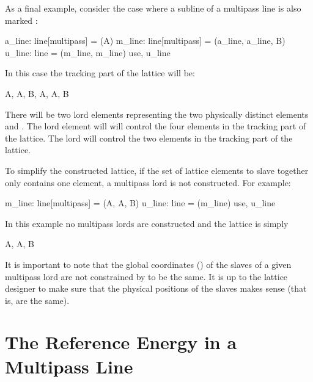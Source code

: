 As a final example, consider the case where a subline of a multipass line is also marked
:
\begin{example}
  a_line: line[multipass] = (A)
  m_line: line[multipass] = (a_line, a_line, B)
  u_line: line = (m_line, m_line)
  use, u_line
\end{example}
In this case the tracking part of the lattice will be:
\begin{example}
  A, A, B, A, A, B
\end{example}
There will be two lord elements representing the two physically distinct elements  and .
The  lord element will will control the four  elements in the tracking
part of the lattice. The  lord will control the two  elements in the tracking part
of the lattice. 

To simplify the constructed lattice, if the set of lattice elements to slave together only contains
one element, a multipass lord is not constructed. For example:
\begin{example}
  m_line: line[multipass] = (A, A, B)
  u_line: line = (m_line)
  use, u_line
\end{example}
In this example no multipass lords are constructed and the lattice is simply
\begin{example}
  A, A, B
\end{example}

It is important to note that the global coordinates () of the slaves of a given
multipass lord are not constrained by \bmad to be the same. It is up to the lattice designer to make
sure that the physical positions of the slaves makes sense (that is, are the same).

\section{The Reference Energy in a Multipass Line}
\label{s:ref.e.multi}

